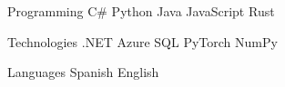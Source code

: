 


\begin{cvskills}

  \cvskill
    {Programming} %
    {{\enskip\cdotp\enskip} C\#
     {\enskip\cdotp\enskip} Python
     {\enskip\cdotp\enskip} Java
     {\enskip\cdotp\enskip} JavaScript
     {\enskip\cdotp\enskip} Rust} %

  \cvskill
    {Technologies} %
    {{\enskip\cdotp\enskip}.NET 
    {\enskip\cdotp\enskip} Azure 
    {\enskip\cdotp\enskip} SQL 
    {\enskip\cdotp\enskip} PyTorch 
    {\enskip\cdotp\enskip} NumPy} %

  \cvskill
    {Languages} %
    {{\enskip\cdotp\enskip}Spanish {\enskip\cdotp\enskip}English} %
\end{cvskills}